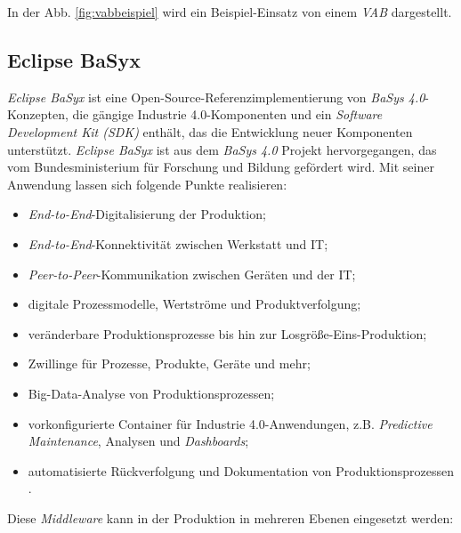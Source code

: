 In der Abb. \ref{fig:vabbeispiel} wird ein Beispiel-Einsatz von einem \textit{VAB} dargestellt.

 



\subsection{Eclipse BaSyx}

\textit{Eclipse BaSyx} ist eine Open-Source-Referenzimplementierung von \textit{BaSys 4.0}-Konzepten, die gängige Industrie 4.0-Komponenten und ein \textit{Software Development Kit (SDK)} enthält, das die Entwicklung neuer Komponenten unterstützt. \textit{Eclipse BaSyx} ist aus dem \textit{BaSys 4.0} Projekt hervorgegangen, das vom Bundesministerium für Forschung und Bildung gefördert wird. Mit seiner Anwendung lassen sich folgende Punkte realisieren:

\begin{itemize}
    \item \textit{End-to-End}-Digitalisierung der Produktion;
    \item \textit{End-to-End}-Konnektivität zwischen Werkstatt und IT;
    \item \textit{Peer-to-Peer}-Kommunikation zwischen Geräten und der IT;
    \item digitale Prozessmodelle, Wertströme und Produktverfolgung;
    \item veränderbare Produktionsprozesse bis hin zur Losgröße-Eins-Produktion;
    \item Zwillinge für Prozesse, Produkte, Geräte und mehr;
    \item Big-Data-Analyse von Produktionsprozessen;
    \item vorkonfigurierte Container für Industrie 4.0-Anwendungen, z.B. \textit{Predictive Maintenance}, Analysen und \textit{Dashboards};
    \item automatisierte Rückverfolgung und Dokumentation von Produktionsprozessen  \cite{eclipsefoundationinc.BaSyxEclipsepedia}.
\end{itemize}

Diese \textit{Middleware} kann in der Produktion in mehreren Ebenen eingesetzt werden:

